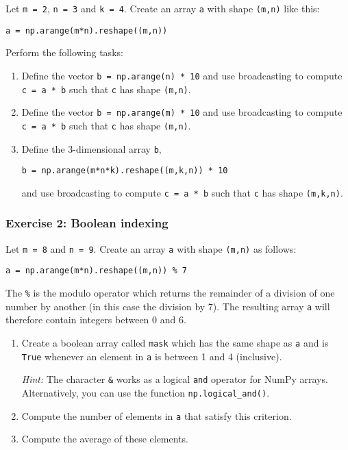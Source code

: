 \documentclass{scrartcl}
\begin{document}
Let \texttt{m\ =\ 2}, \texttt{n\ =\ 3} and \texttt{k\ =\ 4}. Create an
array \texttt{a} with shape \texttt{(m,n)} like this:

\begin{verbatim}
a = np.arange(m*n).reshape((m,n))
\end{verbatim}

Perform the following tasks:

\begin{enumerate}
\def\labelenumi{\arabic{enumi}.}
\item
  Define the vector \texttt{b\ =\ np.arange(n)\ *\ 10} and use
  broadcasting to compute \texttt{c\ =\ a\ *\ b} such that \texttt{c}
  has shape \texttt{(m,n)}.
\item
  Define the vector \texttt{b\ =\ np.arange(m)\ *\ 10} and use
  broadcasting to compute \texttt{c\ =\ a\ *\ b} such that \texttt{c}
  has shape \texttt{(m,n)}.
\item
  Define the 3-dimensional array \texttt{b},

\begin{verbatim}
b = np.arange(m*n*k).reshape((m,k,n)) * 10
\end{verbatim}

  and use broadcasting to compute \texttt{c\ =\ a\ *\ b} such that
  \texttt{c} has shape \texttt{(m,k,n)}.
\end{enumerate}

    \hypertarget{exercise-2-boolean-indexing}{%
\subsubsection{Exercise 2: Boolean
indexing}\label{exercise-2-boolean-indexing}}

Let \texttt{m\ =\ 8} and \texttt{n\ =\ 9}. Create an array \texttt{a}
with shape \texttt{(m,n)} as follows:

\begin{verbatim}
a = np.arange(m*n).reshape((m,n)) % 7
\end{verbatim}

The \texttt{\%} is the modulo operator which returns the remainder of a
division of one number by another (in this case the division by 7). The
resulting array \texttt{a} will therefore contain integers between 0 and
6.

\begin{enumerate}
\def\labelenumi{\arabic{enumi}.}
\item
  Create a boolean array called \texttt{mask} which has the same shape
  as \texttt{a} and is \texttt{True} whenever an element in \texttt{a}
  is between 1 and 4 (inclusive).

  \emph{Hint:} The character \texttt{\&} works as a logical \texttt{and}
  operator for NumPy arrays. Alternatively, you can use the function
  \texttt{np.logical\_and()}.
\item
  Compute the number of elements in \texttt{a} that satisfy this
  criterion.
\item
  Compute the average of these elements.
\end{enumerate}
\end{document}
